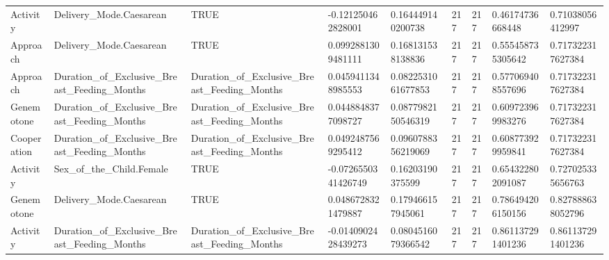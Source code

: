 \begin{longtable}{lllllllll}
Activity & Delivery\_Mode.Caesarean & TRUE & -0.121250462828001 & 0.164449140200738 & 217 & 217 & 0.46174736668448 & 0.71038056412997 \\
Approach & Delivery\_Mode.Caesarean & TRUE & 0.0992881309481111 & 0.168131538138836 & 217 & 217 & 0.555458735305642 & 0.717322317627384 \\
Approach & Duration\_of\_Exclusive\_Breast\_Feeding\_Months & Duration\_of\_Exclusive\_Breast\_Feeding\_Months & 0.0459411348985553 & 0.0822531061677853 & 217 & 217 & 0.577069408557696 & 0.717322317627384 \\
Genemotone & Duration\_of\_Exclusive\_Breast\_Feeding\_Months & Duration\_of\_Exclusive\_Breast\_Feeding\_Months & 0.0448848377098727 & 0.0877982150546319 & 217 & 217 & 0.609723969983276 & 0.717322317627384 \\
Cooperation & Duration\_of\_Exclusive\_Breast\_Feeding\_Months & Duration\_of\_Exclusive\_Breast\_Feeding\_Months & 0.0492487569295412 & 0.0960788356219069 & 217 & 217 & 0.608773929959841 & 0.717322317627384 \\
Activity & Sex\_of\_the\_Child.Female & TRUE & -0.0726550341426749 & 0.16203190375599 & 217 & 217 & 0.654322802091087 & 0.727025335656763 \\
Genemotone & Delivery\_Mode.Caesarean & TRUE & 0.0486728321479887 & 0.179466157945061 & 217 & 217 & 0.786494206150156 & 0.827888638052796 \\
Activity & Duration\_of\_Exclusive\_Breast\_Feeding\_Months & Duration\_of\_Exclusive\_Breast\_Feeding\_Months & -0.0140902428439273 & 0.0804516079366542 & 217 & 217 & 0.861137291401236 & 0.861137291401236 \\
\end{longtable}
